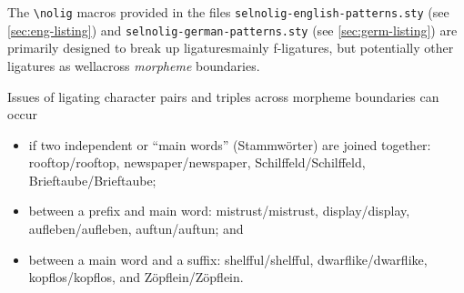 \documentclass[12pt]{article}
\newcommand{\opt}[1]{\texttt{#1}}
\newcommand{\cmmd}[1]{\texttt{\textbackslash #1}}
\begin{document}
The \cmmd{nolig} macros provided in the files \opt{selnolig-english-patterns.sty} (see \cref{sec:eng-listing}) and \opt{selnolig-german-patterns.sty} (see \cref{sec:germ-listing}) are primarily designed to break up ligatures\textemdash mainly f-ligatures, but potentially other ligatures as well\textemdash across \emph{morpheme} boundaries. 

Issues of ligating character pairs and triples across morpheme boundaries can occur 
\begin{itemize}
\item if two independent or \enquote{main words} (Stammwörter) are joined together: \mbox{rooftop}\slash rooftop, \mbox{newspaper}\slash newspaper, \mbox{Schilffeld}\slash Schilffeld, \mbox{Brieftaube}\slash Brieftaube; \phantom{x}   
\item between a prefix and main word: mi\mbox{st}rust\slash mistrust, di\mbox{sp}lay\slash display, \mbox{aufleben}\slash aufleben, \mbox{auftun}\slash auftun; and \phantom{x}
\item between a main word and a suffix: \mbox{shelfful}\slash shelfful, \mbox{dwarflike}\slash  dwarflike, \mbox{kopflos}\slash kopflos, and \mbox{Zöpflein}\slash Zöpflein. \phantom{x}
\end{itemize}
\end{document}
